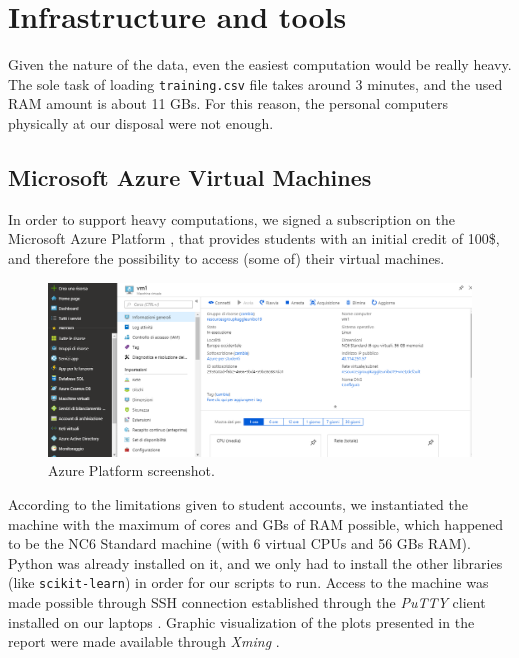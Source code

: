 \chapter{Infrastructure and tools}
\label{capitolo4}
\thispagestyle{empty}

\noindent Given the nature of the data, even the easiest computation would be really heavy. The sole task of loading \texttt{training.csv} file takes around 3 minutes, and the used RAM amount is about 11 GBs. For this reason, the personal computers physically at our disposal were not enough.

\section[Microsoft Azure VMs]{Microsoft Azure Virtual Machines}
In order to support heavy computations, we signed a subscription on the Microsoft Azure Platform \cite{azure}, that provides students with an initial credit of 100\$, and therefore the possibility to access (some of) their virtual machines.

\begin{figure} [h]
	\centering
	\includegraphics[width=0.9\linewidth]{pictures/azure.png}
	\caption{Azure Platform screenshot.}
	\label{fig:azure}
\end{figure}

According to the limitations given to student accounts, we instantiated the machine with the maximum of cores and GBs of RAM possible, which happened to be the NC6 Standard machine (with 6 virtual CPUs and 56 GBs RAM). Python was already installed on it, and we only had to install the other libraries (like \texttt{scikit-learn}) in order for our scripts to run. Access to the machine was made possible through SSH connection established through the \textit{PuTTY} client installed on our laptops \cite{putty}. Graphic visualization of the plots presented in the report were made available through \textit{Xming} \cite{xming}.

